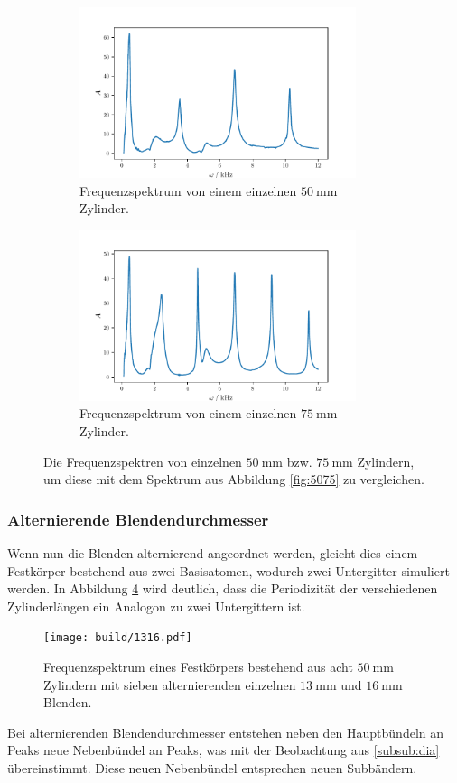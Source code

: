 \begin{figure}
    \begin{subfigure}{0.48\textwidth}%
        \centering%
        \includegraphics[height=5cm]{build/50single.pdf}%
        \caption{Frequenzspektrum von einem einzelnen $\qty{50}{\milli\meter}$ Zylinder.}%
        \label{fig:50sinlge}%
    \end{subfigure}%
    \hfill%
    \begin{subfigure}{0.48\textwidth}%
        \centering%
        \includegraphics[height=5cm]{build/75single.pdf}%
        \caption{Frequenzspektrum von einem einzelnen $\qty{75}{\milli\meter}$ Zylinder.}%
        \label{fig:75single}%
    \end{subfigure}%
    \caption{Die Frequenzspektren von einzelnen $\qty{50}{\milli\meter}$ bzw. $\qty{75}{\milli\meter}$ Zylindern, um diese mit dem Spektrum
    aus Abbildung \ref{fig:5075} zu vergleichen.}%
    \label{fig:75and50single}
\end{figure}%
\FloatBarrier

\subsubsection{Alternierende Blendendurchmesser}
Wenn nun die Blenden alternierend angeordnet werden, gleicht dies einem Festkörper bestehend aus zwei Basisatomen, wodurch zwei Untergitter simuliert werden.
In Abbildung \ref{fig:1316} wird deutlich, dass die Periodizität der verschiedenen Zylinderlängen ein Analogon zu zwei Untergittern ist. 
\begin{figure}
    \centering
    \texttt{[image: build/1316.pdf]}
    \caption{Frequenzspektrum eines Festkörpers bestehend aus acht $\qty{50}{\milli\meter}$ Zylindern mit sieben alternierenden einzelnen $\qty{13}{\milli\meter}$ und 
    $\qty{16}{\milli\meter}$ Blenden.}
    \label{fig:1316}
\end{figure}
Bei alternierenden Blendendurchmesser entstehen neben den Hauptbündeln an Peaks neue Nebenbündel an Peaks, was mit der Beobachtung aus \ref{subsub:dia} übereinstimmt.
Diese neuen Nebenbündel entsprechen neuen Subbändern.